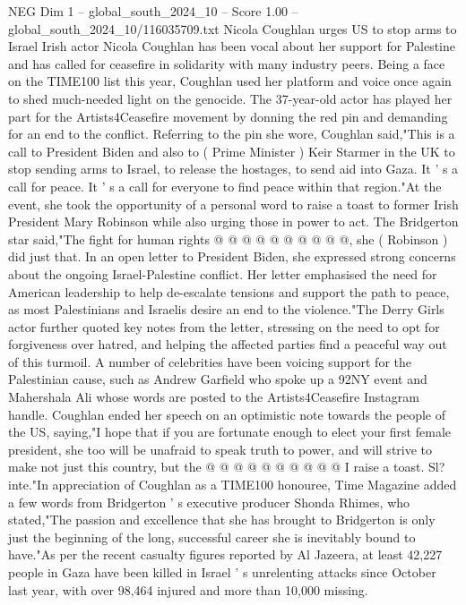 \begin{textsample}{NEG Dim 1 – global\_south\_2024\_10 – Score 1.00 – global\_south\_2024\_10/116035709.txt}  \label{ex:f1_neg_287}
Nicola Coughlan urges US to stop arms to Israel Irish actor Nicola Coughlan has been vocal about her support for Palestine and has called for ceasefire in solidarity with many industry peers.
Being a face on the TIME100 list this year, Coughlan used her platform and voice once again to shed much-needed light on the genocide.
The 37-year-old actor has played her part for the Artists4Ceasefire movement by donning the red pin and demanding for an end to the conflict.
Referring to the pin she wore, Coughlan said,"This is a call to President Biden and also to ( Prime Minister ) Keir Starmer in the UK to stop sending arms to Israel, to release the hostages, to send aid into Gaza.
It ' s a call for peace.
It ' s a call for everyone to find peace within that region."At the event, she took the opportunity of a personal word to raise a toast to former Irish President Mary Robinson while also urging those in power to act.
The Bridgerton star said,"The fight for human rights @ @ @ @ @ @ @ @ @ @, she ( Robinson ) did just that.
In an open letter to President Biden, she expressed strong concerns about the ongoing Israel-Palestine conflict.
Her letter emphasised the need for American leadership to help de-escalate tensions and support the path to peace, as most Palestinians and Israelis desire an end to the violence."The Derry Girls actor further quoted key notes from the letter, stressing on the need to opt for forgiveness over hatred, and helping the affected parties find a peaceful way out of this turmoil.
A number of celebrities have been voicing support for the Palestinian cause, such as Andrew Garfield who spoke up a 92NY event and Mahershala Ali whose words are posted to the Artists4Ceasefire Instagram handle.
Coughlan ended her speech on an optimistic note towards the people of the US, saying,"I hope that if you are fortunate enough to elect your first female president, she too will be unafraid to speak truth to power, and will strive to make not just this country, but the @ @ @ @ @ @ @ @ @ @ I raise a toast.
Sl? inte."In appreciation of Coughlan as a TIME100 honouree, Time Magazine added a few words from Bridgerton ' s executive producer Shonda Rhimes, who stated,"The passion and excellence that she has brought to Bridgerton is only just the beginning of the long, successful career she is inevitably bound to have."As per the recent casualty figures reported by Al Jazeera, at least 42,227 people in Gaza have been killed in Israel ' s unrelenting attacks since October last year, with over 98,464 injured and more than 10,000 missing.

\end{textsample}
